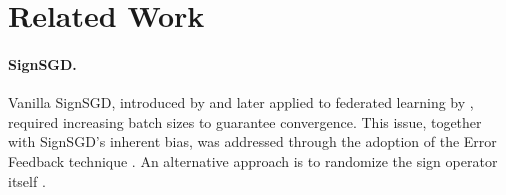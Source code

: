 \documentclass[letterpaper]{article} %
\begin{document}

\section{Related Work}\label{sec:relWork}
\paragraph{SignSGD.} Vanilla SignSGD, introduced by \citet{bernstein2018signsgd} and later applied to federated learning by \citet{bernstein2019signsgdmajority}, required increasing batch sizes to guarantee convergence. This issue, together with SignSGD's inherent bias, was addressed through the adoption of the Error Feedback technique \citep{karimireddy2019efsign}. An alternative approach is to randomize the sign operator itself \citep{chen2020median,safaryan2021ssdm,jin2024stosign}.
\end{document}
